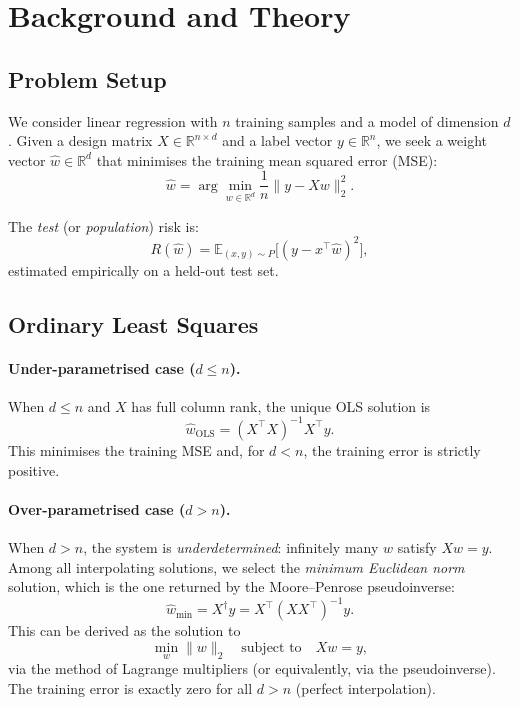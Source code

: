 \documentclass[11pt,a4paper]{article}
\begin{document}
\section{Background and Theory}
\label{sec:theory}

\subsection{Problem Setup}

We consider linear regression with $n$ training samples and a model of dimension $d$.
Given a design matrix $X \in \mathbb{R}^{n \times d}$ and a label vector $y \in \mathbb{R}^n$,
we seek a weight vector $\hat{w} \in \mathbb{R}^d$ that minimises the training mean squared
error (MSE):
\[
  \hat{w} = \arg\min_{w \in \mathbb{R}^d} \frac{1}{n}\|y - Xw\|_2^2.
\]

The \emph{test} (or \emph{population}) risk is:
\[
  R(\hat{w}) = \mathbb{E}_{(x,y)\sim P}\bigl[(y - x^\top \hat{w})^2\bigr],
\]
estimated empirically on a held-out test set.

\subsection{Ordinary Least Squares}

\paragraph{Under-parametrised case ($d \le n$).}
When $d \le n$ and $X$ has full column rank, the unique OLS solution is
\[
  \hat{w}_{\mathrm{OLS}} = (X^\top X)^{-1} X^\top y.
\]
This minimises the training MSE and, for $d < n$, the training error is strictly positive.

\paragraph{Over-parametrised case ($d > n$).}
When $d > n$, the system is \emph{underdetermined}: infinitely many $w$ satisfy $Xw = y$.
Among all interpolating solutions, we select the \emph{minimum Euclidean norm} solution,
which is the one returned by the Moore--Penrose pseudoinverse:
\[
  \hat{w}_{\mathrm{min}} = X^\dagger y = X^\top (X X^\top)^{-1} y.
\]
This can be derived as the solution to
\[
  \min_{w}\|w\|_2 \quad \text{subject to} \quad Xw = y,
\]
via the method of Lagrange multipliers (or equivalently, via the pseudoinverse).
The training error is exactly zero for all $d > n$ (perfect interpolation).
\end{document}

